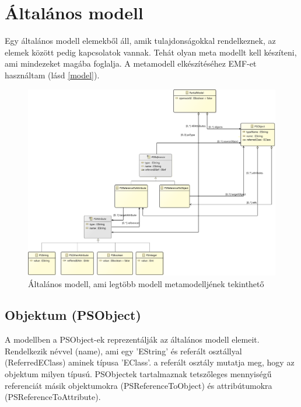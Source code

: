 \nocite{Acceleo}
\nocite{OCL}


\section{Általános modell}

Egy általános modell elemekből áll, amik tulajdonságokkal rendelkeznek, az elemek között pedig kapcsolatok vannak. Tehát olyan meta modellt kell készíteni, ami mindezeket magába foglalja. A metamodell elkészítéséhez EMF-et használtam (lásd \autoref{model}).

\begin{figure}[!ht]
	\centering
	\includegraphics[width=140mm]{figures/partialmodel01.pdf}
	\caption{Általános modell, ami legtöbb modell metamodelljének tekinthető} 
	\label{model}
\end{figure}

\subsection{Objektum (PSObject)}
A modellben a PSObject-ek reprezentálják az általános modell elemeit. Rendelkezik névvel (name), ami egy 'EString' és referált osztállyal (ReferredEClass) aminek típusa 'EClass'. a referált osztály mutatja meg, hogy az objektum milyen típusú. %
PSObjectek tartalmaznak tetszőleges mennyiségű referenciát másik objektumokra (PSReferenceToObject) és attribútumokra (PSReferenceToAttribute).

